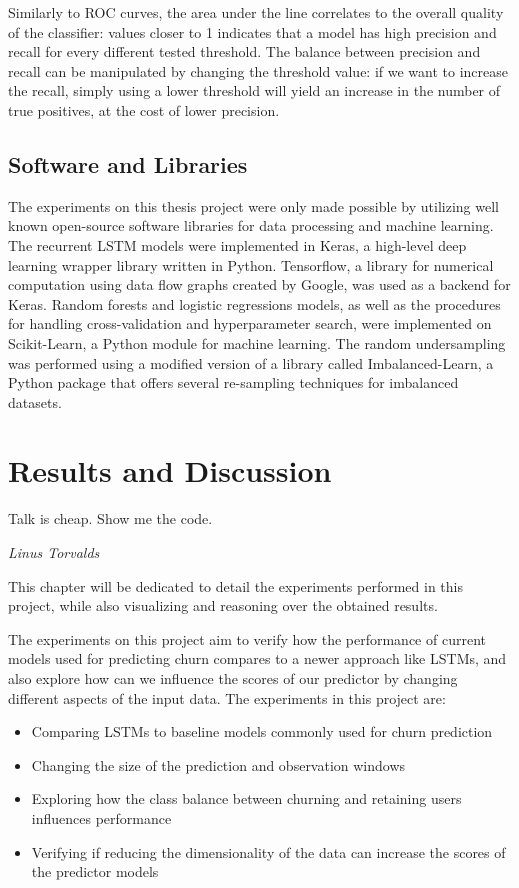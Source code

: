 \documentclass{kththesis}
\begin{document}
Similarly to ROC curves, the area under the line correlates to the overall quality of the classifier: values closer to 1 indicates that a model has high precision and recall for every different tested threshold.  The balance between precision and recall can be manipulated by changing the threshold value: if we want to increase the recall, simply using a lower threshold will yield an increase in the number of true positives, at the cost of lower precision.

\section{Software and Libraries}

The experiments on this thesis project were only made possible by utilizing well known open-source software libraries for data processing and machine learning. The recurrent LSTM models were implemented in Keras\citep{chollet2015keras}, a high-level deep learning wrapper library written in Python.  Tensorflow\citep{abadi2016tensorflow}, a library for numerical computation using data flow graphs created by Google, was used as a backend for Keras. Random forests and logistic regressions models, as well as  the procedures for handling cross-validation and hyperparameter search, were implemented on Scikit-Learn\citep{scikit-learn}, a Python module for machine learning. The random undersampling was performed using a modified version of a library called Imbalanced-Learn\citep{lema2017imbalanced}, a Python package that offers several re-sampling techniques for imbalanced datasets. 

\chapter{Results and Discussion}

\epigraph{Talk is cheap. Show me the code.}{\textit{Linus Torvalds}}

This chapter will be dedicated to detail the experiments performed in this project, while also visualizing and reasoning over the obtained results.

The experiments on this project aim to verify how the performance of current models used for predicting churn compares to a newer approach like LSTMs, and also explore how can we influence the scores of our predictor by changing different aspects of the input data. The experiments in this project are:

\begin{itemize}
\item Comparing LSTMs to baseline models commonly used for churn prediction
\item Changing the size of the prediction and observation windows
\item Exploring how the class balance between churning and retaining users influences performance
\item Verifying if reducing the dimensionality of the data can increase the scores of the predictor models 
\end{itemize}
\end{document}
